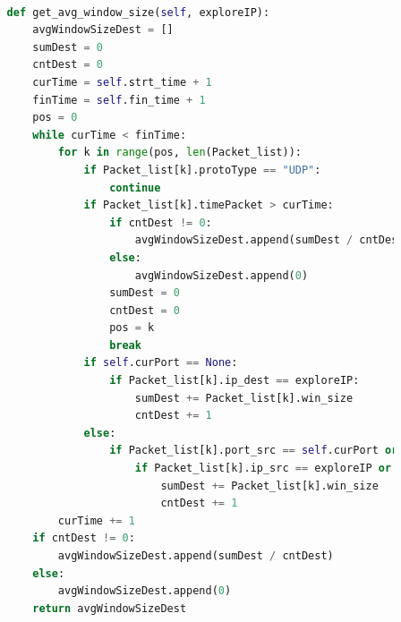 \documentclass[bachelor, och, coursework]{SCWorks}
\begin{document}
\begin{lstlisting}[language=Python]
      
          def get_avg_window_size(self, exploreIP):
              avgWindowSizeDest = []
              sumDest = 0
              cntDest = 0
              curTime = self.strt_time + 1
              finTime = self.fin_time + 1
              pos = 0
              while curTime < finTime:
                  for k in range(pos, len(Packet_list)):
                      if Packet_list[k].protoType == "UDP":
                          continue
                      if Packet_list[k].timePacket > curTime:
                          if cntDest != 0:
                              avgWindowSizeDest.append(sumDest / cntDest)
                          else:
                              avgWindowSizeDest.append(0)
                          sumDest = 0
                          cntDest = 0 
                          pos = k
                          break
                      if self.curPort == None:
                          if Packet_list[k].ip_dest == exploreIP:
                              sumDest += Packet_list[k].win_size
                              cntDest += 1
                      else:
                          if Packet_list[k].port_src == self.curPort or Packet_list[k].port_dest == self.curPort:
                              if Packet_list[k].ip_src == exploreIP or Packet_list[k].ip_dest == exploreIP:
                                  sumDest += Packet_list[k].win_size
                                  cntDest += 1
                  curTime += 1
              if cntDest != 0:
                  avgWindowSizeDest.append(sumDest / cntDest)
              else:
                  avgWindowSizeDest.append(0)
              return avgWindowSizeDest
      

\end{lstlisting}
\end{document}
